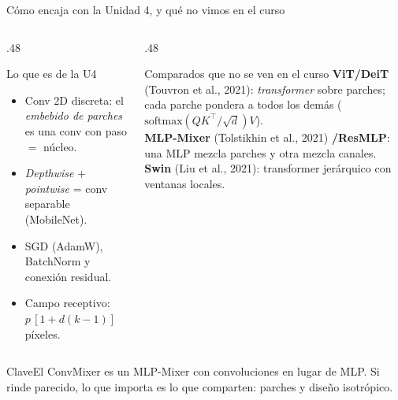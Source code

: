 \documentclass[aspectratio=169,xcolor=table]{beamer}
\newcommand{\clave}[1]{\vfill\begin{alertblock}{Clave}\footnotesize #1\end{alertblock}}
\begin{document}
\begin{frame}{Cómo encaja con la Unidad 4, y qué no vimos en el curso}
  \begin{columns}[T]
    \begin{column}{.48\textwidth}
      \begin{block}{Lo que es de la U4}
        \small
        \begin{itemize}
          \item Conv 2D discreta: el \emph{embebido de parches} es una conv con paso $=$ núcleo.
          \item \emph{Depthwise} + \emph{pointwise} = conv separable (MobileNet).
          \item SGD (AdamW), BatchNorm y conexión residual.
          \item Campo receptivo: $p\,[1+d(k-1)]$ píxeles.
        \end{itemize}
      \end{block}
    \end{column}
    \begin{column}{.48\textwidth}
      \begin{exampleblock}{Comparados que no se ven en el curso}
        \small
        \textbf{ViT/DeiT} (Touvron et al., 2021): \emph{transformer} sobre parches; cada parche pondera a todos los demás
        ($\mathrm{softmax}(QK^\top/\sqrt d)V$).\\[2pt]
        \textbf{MLP-Mixer} (Tolstikhin et al., 2021) \textbf{/ResMLP}: una MLP mezcla parches y otra mezcla canales.\\[2pt]
        \textbf{Swin} (Liu et al., 2021): transformer jerárquico con ventanas locales.
      \end{exampleblock}
    \end{column}
  \end{columns}
  \clave{El ConvMixer es un MLP-Mixer con convoluciones en lugar de MLP. Si rinde parecido, lo que importa es lo
  que comparten: parches y diseño isotrópico.}
\end{frame}

\end{document}

